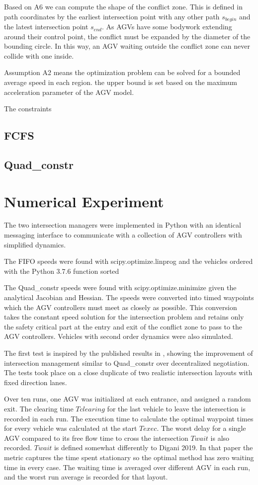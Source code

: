 \documentclass[11pt]{article} %
\begin{document}
Based on A6 we can compute the shape of the conflict zone. This is defined in path coordinates by the earliest intersection point with any other path $s_{begin}$ and the latest intersection point $s_{end}$. As AGVs have some bodywork extending around their control point, the conflict must be expanded by the diameter of the bounding circle. In this way, an AGV waiting outside the conflict zone can never collide with one inside. 

Assumption A2 means the optimization problem can  be solved for a bounded average speed in each region. the upper bound is set based on the maximum acceleration parameter of the AGV model.

The constraints
 
\subsection{FCFS}
\subsection{Quad\_constr}
    

\section{Numerical Experiment}
The two intersection managers were implemented in Python with an identical messaging interface to communicate with a collection of AGV controllers with simplified dynamics. 

The FIFO speeds were found with scipy.optimize.linprog and the vehicles ordered with the Python 3.7.6 function sorted

The Quad\_constr speeds were found with scipy.optimize.minimize given the analytical Jacobian and Hessian.
The speeds were converted into timed waypoints which the AGV controllers must meet as closely as possible. This conversion takes the constant speed solution for the intersection problem and retains only the safety critical part at the entry and exit of the conflict zone to pass to the AGV controllers. Vehicles with second order dynamics were also simulated.

The first test is inspired by the published results in \cite{Digani2019}, showing the improvement of intersection management similar to Quad\_constr over decentralized negotiation. The tests took place on a close duplicate of two realistic intersection layouts with fixed direction lanes.

Over ten runs, one AGV was initialized at each entrance, and assigned a random exit.   The clearing time $Tclearing$ for the last vehicle to leave the intersection is recorded in each run. The execution time to calculate the optimal waypoint times for every vehicle was calculated at the start $Texec$. The worst delay for a single AGV compared to its free flow time to cross the intersection $Twait$ is also recorded.
$Twait$ is defined somewhat differently to Digani 2019. In that paper the metric captures the time spent stationary so the optimal method has zero waiting time in every case. The waiting time is averaged over different AGV in each run, and the worst run average is recorded for that layout.
\end{document}
